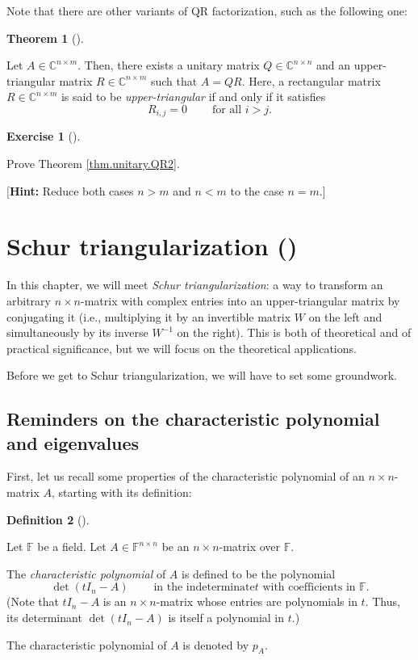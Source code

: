 \documentclass[numbers=enddot,12pt,final,onecolumn,notitlepage]{scrartcl}%
\newcounter{exer}
\numberwithin{exer}{subsection}
\theoremstyle{definition}
\newtheorem{theo}{Theorem}[subsection]
\newenvironment{theorem}[1][]
{\begin{theo}[#1]\begin{leftbar}}
{\end{leftbar}\end{theo}}
\newtheorem{defi}[theo]{Definition}
\newenvironment{definition}[1][]
{\begin{defi}[#1]\begin{leftbar}}
{\end{leftbar}\end{defi}}
\newtheorem{exmp}[exer]{Exercise}
\newenvironment{exercise}[1][]
{\begin{exmp}[#1]\begin{leftbar}}
{\end{leftbar}\end{exmp}}
\begin{document}
Note that there are other variants of QR factorization, such as the following one:

\begin{theorem}
[QR factorization, unitary version]\label{thm.unitary.QR2}Let $A\in
\mathbb{C}^{n\times m}$. Then, there exists a unitary matrix $Q\in
\mathbb{C}^{n\times n}$ and an upper-triangular matrix $R\in\mathbb{C}%
^{n\times m}$ such that $A=QR$. Here, a rectangular matrix $R\in
\mathbb{C}^{n\times m}$ is said to be \emph{upper-triangular} if and only if
it satisfies%
\[
R_{i,j}=0\ \ \ \ \ \ \ \ \ \ \text{for all }i>j.
\]

\end{theorem}

\begin{exercise}
\label{exe.unitary.QR2} Prove Theorem \ref{thm.unitary.QR2}.

[\textbf{Hint:} Reduce both cases $n>m$ and $n<m$ to the case $n=m$.]
\end{exercise}

\section{Schur triangularization (\cite[Chapter 2]{HorJoh13})}

In this chapter, we will meet \emph{Schur triangularization}: a way to
transform an arbitrary $n\times n$-matrix with complex entries into an
upper-triangular matrix by conjugating it (i.e., multiplying it by an
invertible matrix $W$ on the left and simultaneously by its inverse $W^{-1}$
on the right). This is both of theoretical and of practical significance, but
we will focus on the theoretical applications.

Before we get to Schur triangularization, we will have to set some groundwork.\setcounter{subsection}{-1}

\subsection{Reminders on the characteristic polynomial and eigenvalues}

First, let us recall some properties of the characteristic polynomial of an
$n\times n$-matrix $A$, starting with its definition:

\begin{definition}
\label{def.schurtri.ch.pA}Let $\mathbb{F}$ be a field. Let $A\in
\mathbb{F}^{n\times n}$ be an $n\times n$-matrix over $\mathbb{F}$.

The \emph{characteristic polynomial} of $A$ is defined to be the polynomial%
\[
\det\left(  tI_{n}-A\right)  \ \ \ \ \ \ \ \ \ \ \text{in the indeterminate
}t\text{ with coefficients in }\mathbb{F}.
\]
(Note that $tI_{n}-A$ is an $n\times n$-matrix whose entries are polynomials
in $t$. Thus, its determinant $\det\left(  tI_{n}-A\right)  $ is itself a
polynomial in $t$.)

The characteristic polynomial of $A$ is denoted by $p_{A}$.
\end{definition}
\end{document}
